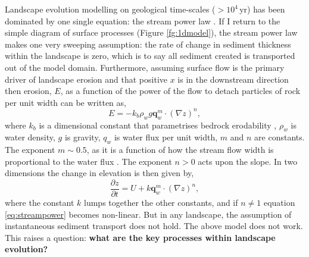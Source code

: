 Landscape evolution modelling on geological time-scales ($>10^{4}$\,yr) has been dominated by one single equation: the stream power law \citep[see][]{howard-1983,howard-1994}. If I return to the simple diagram of surface processes (Figure \ref{fg:1dmodel}), the stream power law makes one very sweeping assumption: the rate of change in sediment thickness within the landscape is zero, which is to say all sediment created is transported out of the model domain. Furthermore, assuming surface flow is the primary driver of landscape erosion and that positive $x$ is in the downstream direction then erosion, $E$, as a function of the power of the flow to detach particles of rock per unit width can be written as,
\begin{equation}
E = -k_{b}\rho_{w}g\mathbf{q}_{w}^{m} \cdot \left(\nabla z\right)^{n},
\label{eq:streampower-inv}
\end{equation}
where $k_{b}$ is a dimensional constant that parametrises bedrock erodability \citep{howard-1983}, $\rho_{w}$ is water density, $g$ is gravity, $q_{w}$ is water flux per unit width, $m$ and $n$ are constants. The exponent $m \sim 0.5$, as it is a function of how the stream flow width is proportional to the water flux \citep[e.g.][]{lacey-1930}. The exponent $n>0$ acts upon the slope. In two dimensions the change in elevation is then given by,
\begin{equation}
\frac{\partial z}{\partial t} = U + k\mathbf{q}_{w}^{m} \cdot \left(\nabla z\right)^{n},
\label{eq:streampower}
\end{equation}
where the constant $k$ lumps together the other constants, and if $n\neq1$ equation \ref{eq:streampower} becomes non-linear. But in any landscape, the assumption of instantaneous sediment transport does not hold. The above model does not work. This raises a question: {\bf what are the key processes within landscape evolution?}

